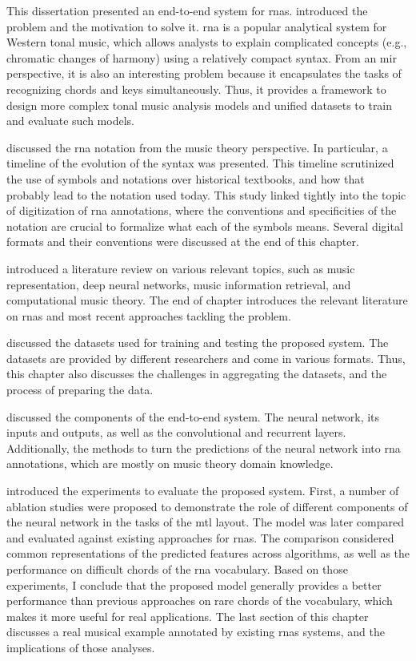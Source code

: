 
This dissertation presented an end-to-end system for
\glspl{rna}.  introduced the problem
and the motivation to solve it. \gls{rna} is a popular
analytical system for Western tonal music, which allows
analysts to explain complicated concepts (e.g., chromatic
changes of harmony) using a relatively compact syntax. From
an \gls{mir} perspective, it is also an interesting problem
because it encapsulates the tasks of recognizing chords and
keys simultaneously. Thus, it provides a framework to design
more complex tonal music analysis models and unified
datasets to train and evaluate such models.

 discussed the
\gls{rna} notation from the music theory perspective. In
particular, a timeline of the evolution of the syntax was
presented. This timeline scrutinized the use of symbols and
notations over historical textbooks, and how that probably
lead to the notation used today. This study linked tightly
into the topic of digitization of \gls{rna} annotations,
where the conventions and specificities of the notation are
crucial to formalize what each of the symbols means. Several
digital formats and their conventions were discussed at the
end of this chapter.

 introduced a literature review on
various relevant topics, such as music representation, deep
neural networks, music information retrieval, and
computational music theory. The end of chapter introduces
the relevant literature on \glspl{rna} and most recent
approaches tackling the problem.

 discussed the
datasets used for training and testing the proposed system.
The datasets are provided by different researchers and come
in various formats. Thus, this chapter also discusses the
challenges in aggregating the datasets, and the process of
preparing the data.

 discussed the components of the
end-to-end system. The neural network, its inputs and
outputs, as well as the convolutional and recurrent layers.
Additionally, the methods to turn the predictions of the
neural network into \gls{rna} annotations, which are mostly
on music theory domain knowledge.

 introduced the experiments
to evaluate the proposed system. First, a number of ablation
studies were proposed to demonstrate the role of different
components of the neural network in the tasks of the
\gls{mtl} layout. The model was later compared and evaluated
against existing approaches for \glspl{rna}. The comparison
considered common representations of the predicted features
across algorithms, as well as the performance on difficult
chords of the \gls{rna} vocabulary. Based on those
experiments, I conclude that the proposed model generally
provides a better performance than previous approaches on
rare chords of the vocabulary, which makes it more useful
for real applications. The last section of this chapter
discusses a real musical example annotated by existing
\glspl{rna} systems, and the implications of those analyses.
